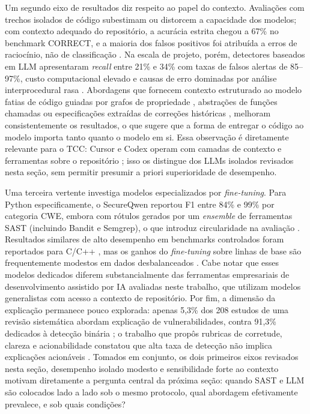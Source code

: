 Um segundo eixo de resultados diz respeito ao papel do contexto. Avaliações com trechos isolados de código subestimam ou distorcem a capacidade dos modelos; com contexto adequado do repositório, a acurácia estrita chegou a 67\% no benchmark CORRECT, e a maioria dos falsos positivos foi atribuída a erros de raciocínio, não de classificação \cite{Li2025LLMVDAsk}. Na escala de projeto, porém, detectores baseados em LLM apresentaram \textit{recall} entre 21\% e 34\% com taxas de falsos alertas de 85–97\%, custo computacional elevado e causas de erro dominadas por análise interprocedural rasa \cite{Li2026ProjectScaleLLM}. Abordagens que fornecem contexto estruturado ao modelo  fatias de código guiadas por grafos de propriedade \cite{Lekssays2025LLMxCPG}, abstrações de funções chamadas \cite{Yang2025ContextVD} ou especificações extraídas de correções históricas \cite{Zhu2025SpecGuidedVD}, melhoram consistentemente os resultados, o que sugere que a forma de entregar o código ao modelo importa tanto quanto o modelo em si. Essa observação é diretamente relevante para o TCC: Cursor e Codex operam com camadas de contexto e ferramentas sobre o repositório \cite{Cursor2025Docs, OpenAI2025CodexDocs}; isso os distingue dos LLMs isolados revisados nesta seção, sem permitir presumir a priori superioridade de desempenho.

Uma terceira vertente investiga modelos especializados por \textit{fine-tuning}. Para Python especificamente, o SecureQwen reportou F1 entre 84\% e 99\% por categoria CWE, embora com rótulos gerados por um \textit{ensemble} de ferramentas SAST (incluindo Bandit e Semgrep), o que introduz circularidade na avaliação \cite{Mechri2025SecureQwen}. Resultados similares de alto desempenho em benchmarks controlados foram reportados para C/C++ \cite{Ferrag2025SecureFalcon}, mas os ganhos do \textit{fine-tuning} sobre linhas de base são frequentemente modestos em dados desbalanceados \cite{Shestov2025LLMFinetune}. Cabe notar que esses modelos dedicados diferem substancialmente das ferramentas empresariais de desenvolvimento assistido por IA avaliadas neste trabalho, que utilizam modelos generalistas com acesso a contexto de repositório. Por fim, a dimensão da explicação permanece pouco explorada: apenas 5,3\% dos 208 estudos de uma revisão sistemática abordam explicação de vulnerabilidades, contra 91,3\% dedicados à detecção binária \cite{Germano2025LLMSLR}; o trabalho que propôs rubricas de corretude, clareza e acionabilidade constatou que alta taxa de detecção não implica explicações acionáveis \cite{Mao2025ExplainableVD}. Tomados em conjunto, os dois primeiros eixos revisados nesta seção, desempenho isolado modesto e sensibilidade forte ao contexto motivam diretamente a pergunta central da próxima seção: quando SAST e LLM são colocados lado a lado sob o mesmo protocolo, qual abordagem efetivamente prevalece, e sob quais condições?


